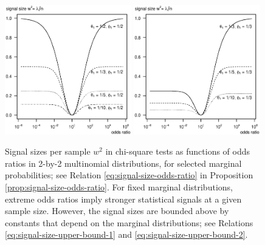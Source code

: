 \begin{figure}
      \centering
      \includegraphics[width=0.49\textwidth]{./singal-vs-odds-p05}
      \includegraphics[width=0.49\textwidth]{./singal-vs-odds-p0333}            
      \caption{Signal sizes per sample $w^2$ in chi-square tests as functions of odds ratios in 2-by-2 multinomial distributions, for selected marginal probabilities; see Relation \eqref{eq:signal-size-odds-ratio} in Proposition \ref{prop:signal-size-odds-ratio}.
      For fixed marginal distributions, extreme odds ratios imply stronger statistical signals at a given sample size.
      However, the signal sizes are bounded above by constants that depend on the marginal distributions; see Relations \eqref{eq:signal-size-upper-bound-1} and \eqref{eq:signal-size-upper-bound-2}.
      } 
      \label{fig:signal-vs-odds}
\end{figure}

